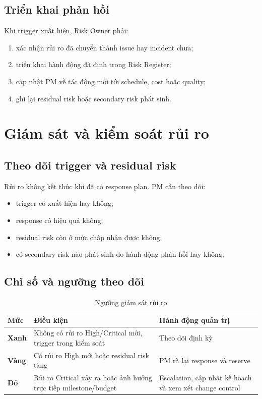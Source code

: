 \subsection{Triển khai phản hồi}

Khi trigger xuất hiện, Risk Owner phải:

\begin{enumerate}
  \item xác nhận rủi ro đã chuyển thành issue hay incident chưa;
  \item triển khai hành động đã định trong Risk Register;
  \item cập nhật PM về tác động mới tới schedule, cost hoặc quality;
  \item ghi lại residual risk hoặc secondary risk phát sinh.
\end{enumerate}

\section{Giám sát và kiểm soát rủi ro}

\subsection{Theo dõi trigger và residual risk}

Rủi ro không kết thúc khi đã có response plan. PM cần theo dõi:

\begin{itemize}
  \item trigger có xuất hiện hay không;
  \item response có hiệu quả không;
  \item residual risk còn ở mức chấp nhận được không;
  \item có secondary risk nào phát sinh do hành động phản hồi hay không.
\end{itemize}

\subsection{Chỉ số và ngưỡng theo dõi}

\begin{table}[H]
\centering
\caption{Ngưỡng giám sát rủi ro}
\label{tab:risk-thresholds}
\begin{tabularx}{\textwidth}{| >{\bfseries}p{2.8cm} | p{4.2cm} | X |}
\hline
Mức & Điều kiện & Hành động quản trị \\
\hline
Xanh & Không có rủi ro High/Critical mới, trigger trong kiểm soát & Theo dõi định kỳ \\ \hline
Vàng & Có rủi ro High mới hoặc residual risk tăng & PM rà lại response và reserve \\ \hline
Đỏ & Rủi ro Critical xảy ra hoặc ảnh hưởng trực tiếp milestone/budget & Escalation, cập nhật kế hoạch và xem xét change control \\
\hline
\end{tabularx}
\end{table}

